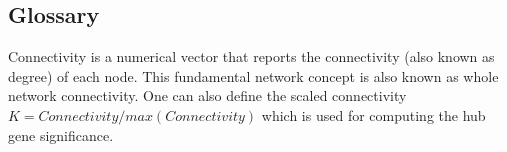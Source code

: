 \subsection{Glossary}
Connectivity is a numerical vector that reports the connectivity (also known as degree) of each node. This fundamental network concept is also known as whole network connectivity. One can also define the scaled connectivity $K = Connectivity/max(Connectivity)$ which is used for computing the hub gene significance.
